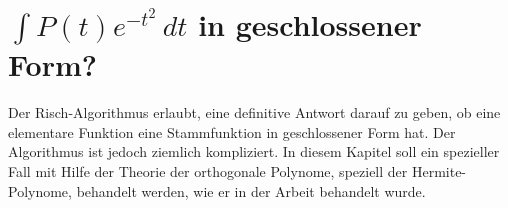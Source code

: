 %
%
%
\chapter{$\int P(t) e^{-t^2} \,dt$ in geschlossener Form?
\label{chapter:dreieck}}
\begin{refsection}

\noindent
Der Risch-Algorithmus erlaubt, eine definitive Antwort darauf zu geben,
ob eine elementare Funktion eine Stammfunktion in geschlossener Form hat.
Der Algorithmus ist jedoch ziemlich kompliziert.
In diesem Kapitel soll ein spezieller Fall mit Hilfe der Theorie der
orthogonale Polynome, speziell der Hermite-Polynome, behandelt werden,
wie er in der Arbeit \cite{dreieck:polint} behandelt wurde.






\printbibliography[heading=subbibliography]
\end{refsection}
